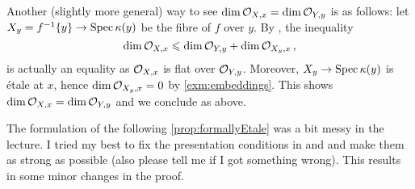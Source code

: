 \documentclass[a4paper, 10pt, oneside, DIV=9, chapterprefix=true, numbers=enddot, bibliography=totoc]{scrbook}
\begin{document}
\begin{rem*}
	Another (slightly more general) way to see $\dim \mathcal{O}_{X,x}=\dim\mathcal{O}_{Y,y}$ is as follows: let $X_y=f^{-1}\{y\}\morphism\Spec \kappa(y)$ be the fibre of $f$ over $y$. By \cite[]{stacks-project}, the inequality
	\begin{equation*}
		\dim\mathcal{O}_{X,x}\leqslant\dim\mathcal{O}_{Y,y}+\dim\mathcal{O}_{X_y,x}\,,
	\end{equation*}
	is actually an equality as $\mathcal{O}_{X,x}$ is flat over $\mathcal{O}_{Y,y}$. Moreover, $X_y\morphism \Spec \kappa(y)$ is étale at $x$, hence $\dim \mathcal{O}_{X_y,x}=0$ by \cref{exm:embeddings}. This shows $\dim \mathcal{O}_{X,x}=\dim\mathcal{O}_{Y,y}$ and we conclude as above.
\end{rem*}
The formulation of the following \cref{prop:formallyEtale} was a bit messy in the lecture. I tried my best to fix the presentation conditions in  and  and make them as strong as possible (also please tell me if I got something wrong). This results in some minor changes in the proof.
\end{document}

